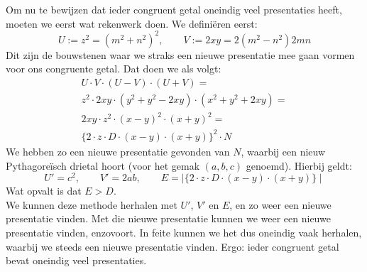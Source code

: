 \documentclass[12pt,reqno]{article}
\theoremstyle{theorem}
\theoremstyle{definition}
\begin{document}
	Om nu te bewijzen dat ieder congruent getal oneindig veel presentaties heeft, moeten we eerst wat rekenwerk doen. We defini\"eren eerst:
	\begin{equation}
		U:= z^2=(m^2+n^2)^2, \qquad V:= 2xy=2(m^2-n^2)2mn
	\end{equation}
	Dit zijn de bouwstenen waar we straks een nieuwe presentatie mee gaan vormen voor ons congruente getal. Dat doen we als volgt:
	\begin{align}
			U\cdot V \cdot (U-V) \cdot (U+V)=\\
			z^2\cdot 2xy\cdot (y^2+y^2-2xy)\cdot (x^2+y^2+2xy)=\\
			2xy\cdot z^2\cdot (x-y)^2\cdot (x+y)^2=\\
			\{2\cdot z\cdot D\cdot (x-y)\cdot (x+y)\}^2\cdot N
	\end{align}
	We hebben zo een nieuwe presentatie gevonden van $N$, waarbij een nieuw Pythagore\"isch drietal hoort (voor het gemak $(a,b,c)$ genoemd). Hierbij geldt:
	\begin{equation}
		U'=c^2, \qquad V'=2ab, \qquad E= \mid \{2\cdot z\cdot D\cdot (x-y)\cdot (x+y)\} \mid
	\end{equation}
	Wat opvalt is dat $E>D$.\\
	
	We kunnen deze methode herhalen met $U'$, $V'$ en $E$, en zo weer een nieuwe presentatie vinden. Met die nieuwe presentatie kunnen we weer een nieuwe presentatie vinden, enzovoort. In feite kunnen we het dus oneindig vaak herhalen, waarbij we steeds een nieuwe presentatie vinden. Ergo: ieder congruent getal bevat oneindig veel presentaties.
	
\end{document}
